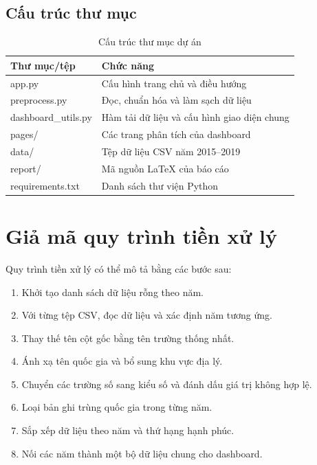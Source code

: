 \subsection{Cấu trúc thư mục}

\begin{table}[H]
\centering
\begin{tabular}{|p{5.2cm}|p{7.2cm}|}
\hline
\textbf{Thư mục/tệp} & \textbf{Chức năng} \\
\hline
app.py & Cấu hình trang chủ và điều hướng \\
\hline
preprocess.py & Đọc, chuẩn hóa và làm sạch dữ liệu \\
\hline
dashboard\_utils.py & Hàm tải dữ liệu và cấu hình giao diện chung \\
\hline
pages/ & Các trang phân tích của dashboard \\
\hline
data/ & Tệp dữ liệu CSV năm 2015--2019 \\
\hline
report/ & Mã nguồn LaTeX của báo cáo \\
\hline
requirements.txt & Danh sách thư viện Python \\
\hline
\end{tabular}
\caption{Cấu trúc thư mục dự án}
\label{tab:cau-truc-thu-muc}
\end{table}

\section{Giả mã quy trình tiền xử lý}

Quy trình tiền xử lý có thể mô tả bằng các bước sau:

\begin{enumerate}
    \item Khởi tạo danh sách dữ liệu rỗng theo năm.
    \item Với từng tệp CSV, đọc dữ liệu và xác định năm tương ứng.
    \item Thay thế tên cột gốc bằng tên trường thống nhất.
    \item Ánh xạ tên quốc gia và bổ sung khu vực địa lý.
    \item Chuyển các trường số sang kiểu số và đánh dấu giá trị không hợp lệ.
    \item Loại bản ghi trùng quốc gia trong từng năm.
    \item Sắp xếp dữ liệu theo năm và thứ hạng hạnh phúc.
    \item Nối các năm thành một bộ dữ liệu chung cho dashboard.
\end{enumerate}

